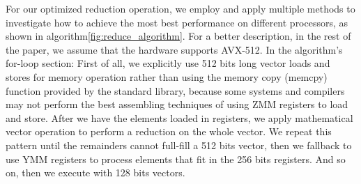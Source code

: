 \documentclass[sigconf]{acmart}
\begin{document}
%
For our optimized reduction operation, we employ and apply multiple
methods to investigate how to achieve the
most best performance on different processors, as shown in algorithm\ref{fig:reduce_algorithm}.
For a better description, in the rest of the paper, we assume that the hardware supports AVX-512.
In the algorithm's for-loop section: First of all, we explicitly use 512 bits long vector loads and stores for memory operation rather than using the memory copy (memcpy) function provided by
the standard library, because some systems and compilers may not perform 
the best assembling techniques of using ZMM registers to load and store.
%
After we have the elements loaded in registers, we apply mathematical vector operation
to perform a reduction on the whole vector. 
We repeat this pattern until the remainders cannot full-fill a 512 bits vector,
then we fallback to use YMM registers to process elements that fit in the 256 bits registers.
And so on, then we execute with 128 bits vectors.
\end{document}
